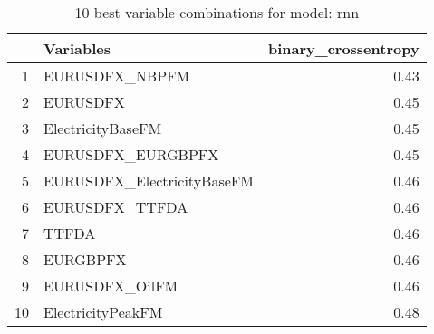 \begin{table}[ht]
\centering
\begin{tabular}{rlr}
  \hline
 & Variables & binary\_crossentropy \\ 
  \hline
1 & EURUSDFX\_NBPFM & 0.43 \\ 
  2 & EURUSDFX & 0.45 \\ 
  3 & ElectricityBaseFM & 0.45 \\ 
  4 & EURUSDFX\_EURGBPFX & 0.45 \\ 
  5 & EURUSDFX\_ElectricityBaseFM & 0.46 \\ 
  6 & EURUSDFX\_TTFDA & 0.46 \\ 
  7 & TTFDA & 0.46 \\ 
  8 & EURGBPFX & 0.46 \\ 
  9 & EURUSDFX\_OilFM & 0.46 \\ 
  10 & ElectricityPeakFM & 0.48 \\ 
   \hline
\end{tabular}
\caption{10 best variable combinations for model: rnn} 
\label{tab:rnn_top_10}
\end{table}
